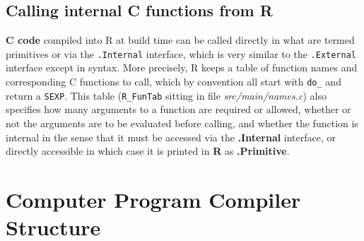 \documentclass[thesis=M,english]{FITthesis}[2018/10/20]
\newcommand{\code}[1]{\texttt{#1}}
\begin{document}

\subsection{Calling internal C functions from R}


\textbf{C code} compiled into R at build time can be called directly in what are termed primitives or via the \code{.Internal} interface, which is very similar to the \code{.External} interface except in syntax. More precisely, R keeps a table of function names and corresponding C functions to call, which by convention all start with \code{do{\_}} and return a \code{SEXP}. This table (\code{R{\_}FunTab} sitting in file \textit{src/main/names.c}) also specifies how many arguments to a function are required or allowed, whether or not the arguments are to be evaluated before calling, and whether the function is internal in the sense that it must be accessed via the \textbf{.Internal} interface, or directly accessible in which case it is printed in \textbf{R} as \textbf{.Primitive}.

\section{Computer Program Compiler Structure}




\end{document}
